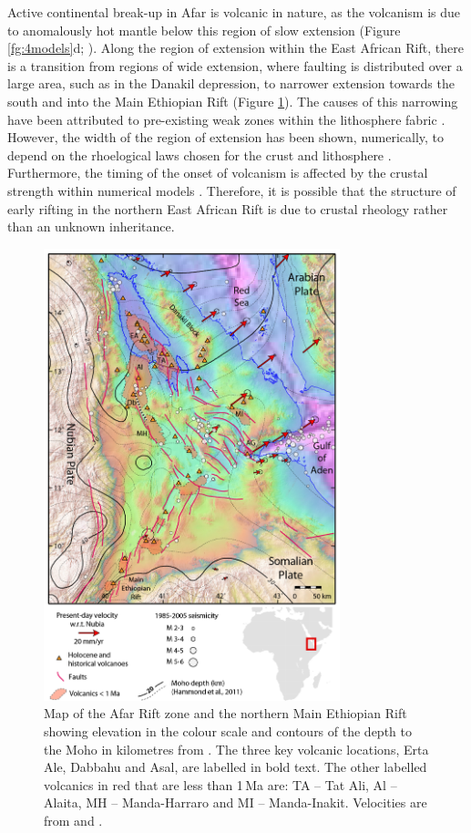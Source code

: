 Active continental break-up in Afar is volcanic in nature, as the volcanism is due to anomalously hot mantle below this region of slow extension (Figure \ref{fg:4models}d; \citealp{armitage-etal-epsl-2015}). Along the region of extension within the East African Rift, there is a transition from regions of wide extension, where faulting is distributed over a large area, such as in the Danakil depression, to narrower extension towards the south and into the Main Ethiopian Rift (Figure \ref{fg:afar-map}). The causes of this narrowing have been attributed to pre-existing weak zones within the lithosphere fabric \citep{keranen-etal-2009}. However, the width of the region of extension has been shown, numerically, to depend on the rhoelogical laws chosen for the crust and lithosphere \citep[e.g.][]{buck-1991,brun-1999,brune-etal-2017}. Furthermore, the timing of the onset of volcanism is affected by the crustal strength within numerical models \citep{ros-etal-2017}. Therefore, it is possible that the structure of early rifting in the northern East African Rift is due to crustal rheology rather than an unknown inheritance.

\begin{figure}
\centering
\includegraphics[width=8.6cm]{./figures/ch2-afar-map.png}
\caption{Map of the Afar Rift zone and the northern Main Ethiopian Rift showing elevation in the colour scale and contours of the depth to the Moho in kilometres from \cite{hammond-etal-2011}. The three key volcanic locations, Erta Ale, Dabbahu and Asal, are labelled in bold text. The other labelled volcanics in red that are less than 1\,Ma are: TA – Tat Ali, Al – Alaita, MH – Manda-Harraro and MI – Manda-Inakit. Velocities are from \cite{nooner-etal-2009} and \cite{reilinger-2011}.}
\label{fg:afar-map}
\end{figure}

